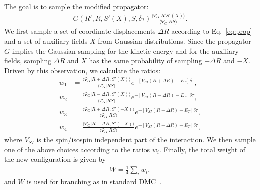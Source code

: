 \documentclass[aps,prc,twocolumn,superscriptaddress,floatfix]{revtex4-1}
\begin{document}
The goal is to sample the modified propagator:
\begin{align}
G(R',R,S'(X),S,\delta\tau)\frac{\langle\Psi_G|R'S'(X)\rangle}{\langle\Psi_G|RS\rangle} .
\end{align}
We first sample a set of coordinate displacements $\Delta R$ according
to Eq.~\ref{eq:prop} and a
set of auxiliary fields $X$ from Gaussian distributions.
Since the propagator $G$ implies the Gaussian sampling for the kinetic energy and 
for the auxiliary fields, sampling $\Delta R$ and $X$ has the same probability
of sampling $-\Delta R$ and $-X$.
Driven by this observation, we calculate the ratios:
\begin{align}
w_1&=\frac{\langle\Psi_G|R+\Delta R,S'(X)\rangle}{\langle\Psi_G|RS\rangle}e^{-[V_{SI}(R+\Delta R)-E_T]\delta\tau},
\nonumber \\
w_2&=\frac{\langle\Psi_G|R-\Delta R,S'(X)\rangle}{\langle\Psi_G|RS\rangle}e^{-[V_{SI}(R-\Delta R)-E_T]\delta\tau},
\nonumber \\
w_3&=\frac{\langle\Psi_G|R+\Delta R,S'(-X)\rangle}{\langle\Psi_G|RS\rangle}e^{-[V_{SI}(R+\Delta R)-E_T]\delta\tau},
\nonumber \\
w_4&=\frac{\langle\Psi_G|R-\Delta R,S'(-X)\rangle}{\langle\Psi_G|RS\rangle}e^{-[V_{SI}(R-\Delta R)-E_T]\delta\tau},
\label{eq:w_i}
\end{align}
where $V_{SI}$ is the spin/isospin independent part of the interaction.
We then sample one of the above choices according to the ratios $w_i$.
Finally, the total weight of the new configuration is given by
\begin{align}
W=\frac{1}{4}\sum_i w_i ,
\end{align}
and $W$ is used for branching as in standard DMC~\cite{Carlson:2015}.
\end{document}
